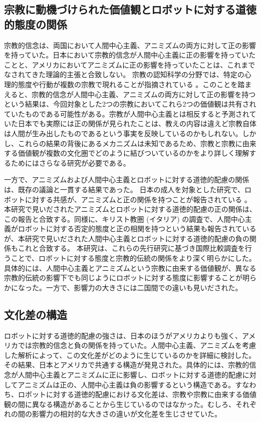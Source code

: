 \documentclass[a4j,12pt]{jreport}
\begin{document}
\subsection{宗教に動機づけられた価値観とロボットに対する道徳的態度の関係}
宗教的信念は、両国において人間中心主義、アニミズムの両方に対して正の影響を持っていた。日本において宗教的信念が人間中心主義に正の影響を持っていたことと、アメリカにおいてアニミズムに正の影響を持っていたことは、これまでなされてきた理論的主張\cite{hosaka}と合致しない。
宗教の認知科学\cite{csr}の分野では、特定の心理的態度や行動が複数の宗教で現れることが指摘されている\cite{jong} 。このことを踏まえると、宗教的信念が人間中心主義、アニミズムの両方に対して正の影響を持つという結果は、今回対象とした2つの宗教においてこれら2つの価値観は共有されていたものである可能性がある。宗教が人間中心主義とは相反すると予測されていた日本でも実際には正の関係が見られたことは、教えの内容は違えど宗教自体は人間が生み出したものであるという事実を反映しているのかもしれない。しかし、これらの結果の背後にあるメカニズムは未知であるため、宗教と宗教に由来する価値観が複数の文化圏でどのように結びついているのかをより詳しく理解するためにはさらなる研究が必要である。


一方で、アニミズムおよび人間中心主義とロボットに対する道徳的配慮の関係は、既存の議論と一貫する結果であった。
日本の成人を対象とした研究で、ロボットに対する共感が、アニミズムと正の関係を持つことが報告されている\cite{okanda} 。本研究で見いだされたアニミズムとロボットに対する道徳的配慮の正の関係は、この報告と合致する。同様に、キリスト教圏 (イタリア) の調査で、人間中心主義がロボットに対する否定的態度と正の相関を持つという結果も報告されている\cite{fortu}が、本研究で見いだされた人間中心主義とロボットに対する道徳的配慮の負の関係もこれと合致する。
本研究は、これらの先行研究に基づき国際比較調査を行うことで、ロボットに対する態度と宗教的伝統の関係をより深く明らかにした。具体的には、人間中心主義とアニミズムという宗教に由来する価値観が、異なる宗教的伝統の影響下でも同じようにロボットに対する態度に影響することが明らかになった。一方で、影響力の大きさには二国間での違いも見いだされた。


\subsection{文化差の構造}
ロボットに対する道徳的配慮の強さは、日本のほうがアメリカよりも強く、アメリカでは宗教的信念と負の関係を持っていた。人間中心主義、アニミズムを考慮した解析によって、この文化差がどのように生じているのかを詳細に検討した。その結果、日本とアメリカで共通する構造が発見された。具体的には、宗教的信念が人間中心主義とアニミズムに正に影響し、ロボットに対する道徳的配慮に対してアニミズムは正の、人間中心主義は負の影響するという構造である。すなわち、ロボットに対する道徳的配慮における文化差は、宗教や宗教に由来する価値観の間に異なる構造があることから生じているのではなかった。むしろ、それぞれの間の影響力の相対的な大きさの違いが文化差を生じさせていた。
\end{document}
